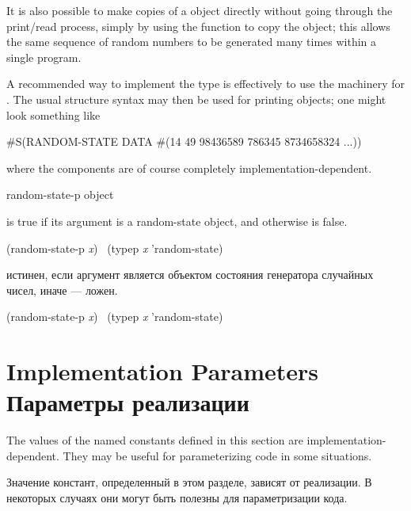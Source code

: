 \begin{defun}[Function]
\begin{rationale}
It is also possible to make copies of a  object
directly without going through the print/read process, simply by
using the  function to copy the object; this allows
the same sequence of random numbers to be generated many times
within a single program.
\end{rationale}
\betweennoterule
\begin{implementation}
A recommended way to implement the type 
is effectively to use the machinery for .
The usual structure syntax may then be used for printing 
objects; one might look something like
\begin{lisp}
\#S(RANDOM-STATE DATA \#(14 49 98436589 786345 8734658324 ...))
\end{lisp}
where the components are of course completely implementation-dependent.
\end{implementation}
\afternoterule
\end{defun}

\begin{defun}[Function]
random-state-p object

 is true if its argument is a random-state object,
and otherwise is false.
\begin{lisp}
(random-state-p \emph{x}) \EQ\ (typep \emph{x} 'random-state)
\end{lisp}

 истинен, если аргумент является объектом состояния
генератора случайных чисел, иначе --- ложен.
\begin{lisp}
(random-state-p \emph{x}) \EQ\ (typep \emph{x} 'random-state)
\end{lisp}
\end{defun}

\section{Implementation Parameters Параметры реализации}

The values of the named constants defined in this section are
implementation-dependent.  They may be useful for parameterizing
code in some situations.

Значение констант, определенный в этом разделе, зависят от реализации. В
некоторых случаях они могут быть полезны для параметризации кода.


